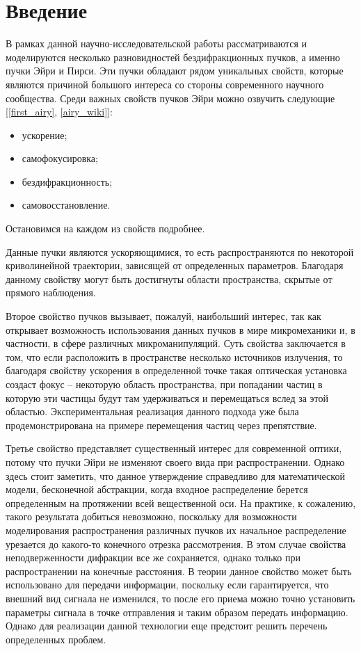     \section*{Введение}
    {

    В рамках данной научно-исследовательской работы рассматриваются и
    моделируются несколько разновидностей бездифракционных пучков, а именно
    пучки Эйри и Пирси. Эти пучки обладают рядом уникальных свойств, которые являются причиной большого интереса со стороны современного научного сообщества.
    Среди важных свойств пучков Эйри можно озвучить следующие [\ref{first_airy}, \ref{airy_wiki}]:
    \begin{itemize}
        \item ускорение;
        \item самофокусировка;
        \item бездифракционность;
        \item самовосстановление.
    \end{itemize}
    \vspace{0.2cm}
    Остановимся на каждом из свойств подробнее.

    Данные пучки являются ускоряющимися, то есть распространяются по некоторой криволинейной траектории, зависящей от определенных параметров. Благодаря данному свойству могут быть достигнуты области пространства, скрытые от прямого наблюдения.

    Второе свойство пучков вызывает, пожалуй, наибольший интерес, так как открывает возможность использования данных пучков в мире микромеханики и, в частности, в сфере различных микроманипуляций. Суть свойства заключается в том, что если расположить в пространстве несколько источников излучения, то благодаря свойству ускорения в определенной точке такая оптическая установка создаст фокус -- некоторую область пространства, при попадании частиц в которую эти частицы будут там удерживаться и перемещаться вслед за этой областью. Экспериментальная реализация данного подхода уже была продемонстрирована на примере перемещения частиц через препятствие.

    Третье свойство представляет существенный интерес для современной оптики, потому что пучки Эйри не изменяют своего вида при распространении. Однако здесь стоит заметить, что данное утверждение справедливо для математической модели, бесконечной абстракции, когда входное распределение берется определенным на протяжении всей вещественной оси. На практике, к сожалению, такого результата добиться невозможно, поскольку для возможности моделирования распространения различных пучков их начальное распределение урезается до какого-то конечного отрезка рассмотрения. В этом случае свойства неподверженности дифракции все же сохраняется, однако только при распространении на конечные расстояния. В теории данное свойство может быть использовано для передачи информации, поскольку если гарантируется, что внешний вид сигнала не изменился, то после его приема можно точно установить параметры сигнала в точке отправления и таким образом передать информацию. Однако для реализации данной технологии еще предстоит решить перечень определенных проблем.

}
